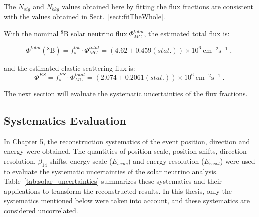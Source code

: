 The $N_{sig}$ and $N_{bkg}$ values obtained here by fitting the flux fractions are consistent with the values obtained in Sect.~\ref{sect:fitTheWhole}.

With the nominal $^8$B solar neutrino flux $\Phi^{total}_{MC}$, the estimated total flux is:

\begin{equation}
\Phi^{total}(\mathrm{^8 B})=f^{tot}_s\cdot \Phi^{total}_{MC}=(4.62 \pm 0.459(stat.))\times 10^6~\mathrm{cm^{-2}s^{-1}}\; ,
\end{equation}

and the estimated elastic scattering flux is:
\begin{equation}
\Phi^{ES}=f^{ES}_s\cdot \Phi^{total}_{MC}=(2.074\pm 0.2061(stat.))\times 10^6~\mathrm{cm^{-2}s^{-1}}\; .
\end{equation}

The next section will evaluate the systematic uncertainties of the flux fractions.

\subsection{Systematics Evaluation}
In Chapter 5, the reconstruction systematics of the event position, direction and energy were obtained. The quantities of position scale, position shifts, direction resolution, $\beta_{14}$ shifts, energy scale ($E_{scale}$) and energy resolution ($E_{resol}$) were used to evaluate the systematic uncertainties of the solar neutrino analysis. Table~\ref{tab:solar_uncertainties} summarizes these systematics and their applications to transform the reconstructed results. In this thesis, only the systematics mentioned below were taken into account, and these systematics are considered uncorrelated. 


